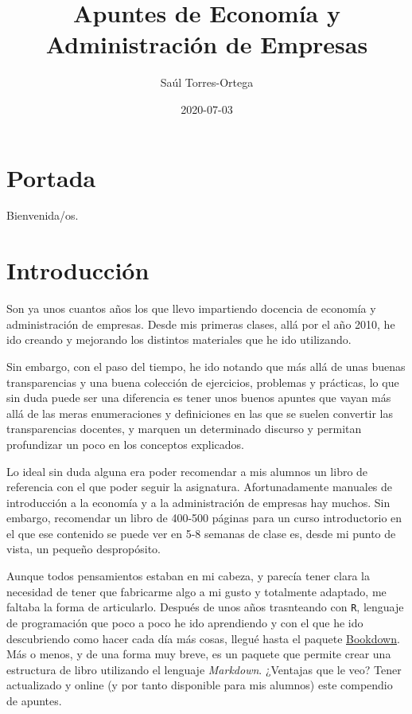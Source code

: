 \documentclass[
]{krantz}
\title{Apuntes de Economía y Administración de Empresas}
\author{Saúl Torres-Ortega}
\date{2020-07-03}
\begin{document}
\maketitle

{
\setcounter{tocdepth}{2}
\tableofcontents
}
\hypertarget{portada}{%
\chapter*{Portada}\label{portada}}


Bienvenida/os.

\hypertarget{introducciuxf3n}{%
\chapter*{Introducción}\label{introducciuxf3n}}


Son ya unos cuantos años los que llevo impartiendo docencia de economía y administración de empresas. Desde mis primeras clases, allá por el año 2010, he ido creando y mejorando los distintos materiales que he ido utilizando.

Sin embargo, con el paso del tiempo, he ido notando que más allá de unas buenas transparencias y una buena colección de ejercicios, problemas y prácticas, lo que sin duda puede ser una diferencia es tener unos buenos apuntes que vayan más allá de las meras enumeraciones y definiciones en las que se suelen convertir las transparencias docentes, y marquen un determinado discurso y permitan profundizar un poco en los conceptos explicados.

Lo ideal sin duda alguna era poder recomendar a mis alumnos un libro de referencia con el que poder seguir la asignatura. Afortunadamente manuales de introducción a la economía y a la administración de empresas hay muchos. Sin embargo, recomendar un libro de 400-500 páginas para un curso introductorio en el que ese contenido se puede ver en 5-8 semanas de clase es, desde mi punto de vista, un pequeño despropósito.

Aunque todos pensamientos estaban en mi cabeza, y parecía tener clara la necesidad de tener que fabricarme algo a mi gusto y totalmente adaptado, me faltaba la forma de articularlo. Después de unos años trasnteando con \texttt{R}, lenguaje de programación que poco a poco he ido aprendiendo y con el que he ido descubriendo como hacer cada día más cosas, llegué hasta el paquete \href{https://bookdown.org/}{Bookdown}. Más o menos, y de una forma muy breve, es un paquete que permite crear una estructura de libro utilizando el lenguaje \emph{Markdown}. ¿Ventajas que le veo? Tener actualizado y online (y por tanto disponible para mis alumnos) este compendio de apuntes.
\end{document}
